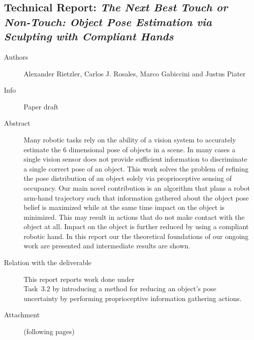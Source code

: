 \documentclass[a4paper,11pt,pdf]{../templates/pacmanreport}
\begin{document}

\subsection{Technical Report: \em The Next Best Touch or Non-Touch:
Object Pose Estimation via Sculpting with Compliant Hands}
\begin{description}
    \item[Authors] Alexander Rietzler, Carlos J. Rosales, Marco Gabiccini and Justus Piater
    \item[Info] Paper draft%
    \item[Abstract] Many robotic tasks rely on the ability of a vision system to accurately estimate the 6 dimensional pose of objects in a scene.
In many cases a single vision sensor does not provide sufficient information to discriminate a single correct
pose of an object. This work solves the problem of refining the pose distribution 
of an object solely via proprioceptive sensing of occupancy.
Our main novel contribution is an algorithm that plans a robot arm-hand trajectory such that 
information gathered about the object pose belief is maximized while at the same time impact on the object is minimized. 
This may result in actions that do not make contact with the object at all.
Impact on the object is further reduced by using a compliant robotic hand.
In this report our the theoretical foundations of our ongoing work are presented and intermediate results are shown. %

    \item [Relation with the deliverable] This report reports work done under\\ Task~3.2 by introducing a method for reducing an object's pose uncertainty by performing proprioceptive information
    gathering actions.
    \item[Attachment] (following pages) %
\end{description}

\end{document}
